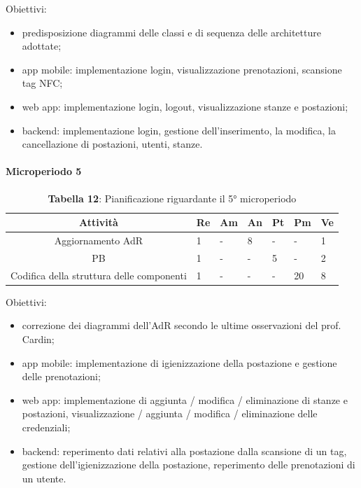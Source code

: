 Obiettivi:
\begin{itemize}
	\item predisposizione diagrammi delle classi e di sequenza delle architetture adottate; 
	\item app mobile: implementazione login, visualizzazione prenotazioni, scansione tag NFC;
	\item web app: implementazione login, logout, visualizzazione stanze e postazioni;
	\item backend: implementazione login, gestione dell'inserimento, la modifica, la cancellazione di postazioni, utenti, stanze.
\end{itemize}

\paragraph{Microperiodo 5}
\begin{table}[H]
	\centering
	\renewcommand{\arraystretch}{1.5}
	\begin{tabular}{|c|p{10mm}|p{10mm}|p{10mm}|p{10mm}|p{10mm}|p{10mm}|}
		\hline
		\rowcolor{lighter-grayer}
		\textbf{Attività}                         & \textbf{Re} & \textbf{Am} & \textbf{An} & \textbf{Pt} & \textbf{Pm} & \textbf{Ve} \\ \hline
		
		Aggiornamento AdR                         & 1           &     -        & 8           &      -       &      -       & 1           \\ \hline
		PB                                        & 1           &      -       &    -         & 5           &      -       & 2           \\ \hline
		Codifica della struttura delle componenti & 1           &       -      &   -          &      -       & 20          & 8           \\ \hline
		
	\end{tabular}
	\caption*{\textbf{Tabella 12}: Pianificazione riguardante il 5° microperiodo\\}
\end{table}

Obiettivi:
\begin{itemize}
	\item correzione dei diagrammi dell'AdR secondo le ultime osservazioni del prof. Cardin;
	\item app mobile: implementazione di igienizzazione della postazione e gestione delle prenotazioni;
	\item web app: implementazione di aggiunta / modifica / eliminazione di stanze e postazioni, visualizzazione / aggiunta / modifica / eliminazione delle credenziali;
	\item backend: reperimento dati relativi alla postazione dalla scansione di un tag, gestione dell'igienizzazione della postazione, reperimento delle prenotazioni di un utente.
\end{itemize}

